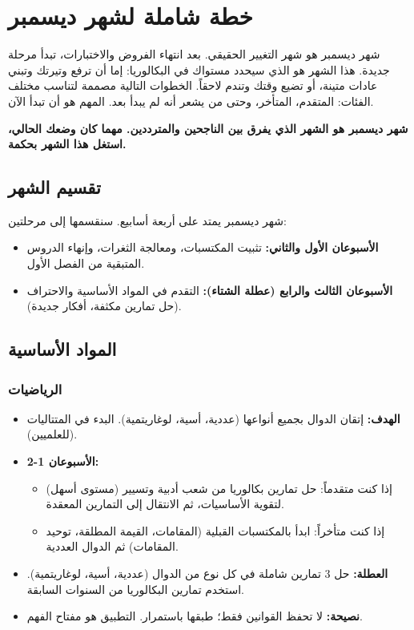 \documentclass[12pt,a4paper]{book}
\newcommand{\importantAr}[1]{%
	\begin{important}
		\bfseries #1
	\end{important}
}
\begin{document}
	
\section{خطة شاملة لشهر ديسمبر }

شهر ديسمبر هو شهر التغيير الحقيقي. بعد انتهاء الفروض والاختبارات، تبدأ مرحلة جديدة. هذا الشهر هو الذي سيحدد مستواك في البكالوريا: إما أن ترفع وتيرتك وتبني عادات متينة، أو تضيع وقتك وتندم لاحقاً. الخطوات التالية مصممة لتناسب مختلف الفئات: المتقدم، المتأخر، وحتى من يشعر أنه لم يبدأ بعد. المهم هو أن تبدأ الآن.

\importantAr{شهر ديسمبر هو الشهر الذي يفرق بين الناجحين والمترددين. مهما كان وضعك الحالي، استغل هذا الشهر بحكمة.}

\subsection{تقسيم الشهر}
شهر ديسمبر يمتد على أربعة أسابيع. سنقسمها إلى مرحلتين:
\begin{itemize}
	\item \textbf{الأسبوعان الأول والثاني:} تثبيت المكتسبات، ومعالجة الثغرات، وإنهاء الدروس المتبقية من الفصل الأول.
	\item \textbf{الأسبوعان الثالث والرابع (عطلة الشتاء):} التقدم في المواد الأساسية والاحتراف (حل تمارين مكثفة، أفكار جديدة).
\end{itemize}

\subsection{المواد الأساسية}

\subsubsection*{الرياضيات}
\begin{itemize}
	\item \textbf{الهدف:} إتقان الدوال بجميع أنواعها (عددية، أسية، لوغاريتمية). البدء في المتتاليات (للعلميين).
	\item \textbf{الأسبوعان 1-2:} 
	\begin{itemize}
		\item إذا كنت متقدماً: حل تمارين بكالوريا من شعب أدبية وتسيير (مستوى أسهل) لتقوية الأساسيات، ثم الانتقال إلى التمارين المعقدة.
		\item إذا كنت متأخراً: ابدأ بالمكتسبات القبلية (المقامات، القيمة المطلقة، توحيد المقامات) ثم الدوال العددية.
	\end{itemize}
	\item \textbf{العطلة:} حل 3 تمارين شاملة في كل نوع من الدوال (عددية، أسية، لوغاريتمية). استخدم تمارين البكالوريا من السنوات السابقة.
	\item \textbf{نصيحة:} لا تحفظ القوانين فقط؛ طبقها باستمرار. التطبيق هو مفتاح الفهم.
\end{itemize}
\end{document}
